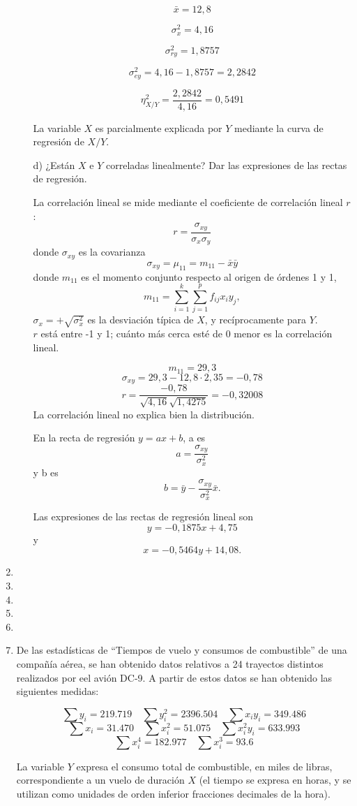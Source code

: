 \documentclass[10pt,a4paper]{article}
\begin{document}
\begin{enumerate}
\begin{itemize}
$$\bar x = 12,8$$

$$\sigma^2_x = 4,16$$

$$\sigma^2_{ry} = 1,8757$$

$$\sigma^2_{ey} = 4,16 - 1,8757 = 2,2842$$

$$\eta^2_{X/Y} = \frac{2,2842}{4,16} = 0,5491$$

La variable $X$ es parcialmente explicada por $Y$ mediante la curva de regresión de $X/Y$.

\item[d)]¿Están $X$ e $Y$ correladas linealmente? Dar las expresiones de las rectas de regresión.

La correlación lineal se mide mediante el coeficiente de correlación lineal $r$:
$$r = \frac{\sigma_{xy}}{\sigma_x \sigma_y}$$
donde $\sigma_{xy}$ es la covarianza
$$\sigma_{xy} = \mu_{11} = m_{11} - \bar x \bar y$$
donde $m_{11}$ es el momento conjunto respecto al origen de órdenes 1 y 1,
$$m_{11} = \sum_{i=1}^k \sum_{j=1}^p f_{ij} x_i y_j,$$
$\sigma_x = +\sqrt{\sigma_x^2}$ es la desviación típica de $X$, y recíprocamente para $Y$.
\\$r$ está entre -1 y 1; cuánto más cerca esté de 0 menor es la correlación lineal.

$$m_{11} = 29,3$$
$$\sigma_{xy} = 29,3 - 12,8\cdot2,35 = -0,78$$
$$r = \frac{-0,78}{\sqrt{4,16}\sqrt{1,4275}} = -0,32008$$
La correlación lineal no explica bien la distribución.

En la recta de regresión $y = ax + b$, a es
$$a = \frac{\sigma_{xy}}{\sigma_x^2}$$
y b es
$$b = \bar y - \frac{\sigma_{xy}}{\sigma_x^2} \bar x.$$

Las expresiones de las rectas de regresión lineal son
$$y = -0,1875x + 4,75$$
y
$$x = -0,5464y + 14,08.$$

\end{itemize}

\newpage
\item
\newpage
\item
\newpage
\item
\newpage
\item
\newpage
\item
\newpage


        \item De las estadísticas de ``Tiempos de vuelo y consumos de combustible'' de una compañía aérea, se han obtenido datos relativos a 24 trayectos distintos realizados por eel avión DC-9. A partir de estos datos se han obtenido las siguientes medidas:
            \begin{center}
                \[
                \sum y_i = 219.719 \quad  \sum y_i^2 = 2396.504 \quad \sum x_i y_i = 349.486
                \]
                \[
                \sum x_i = 31.470 \quad \sum x_i^2 = 51.075 \quad \sum x_i^2 y_i = 633.993
                \]
                \[
                \sum x_i^4 = 182.977 \quad \sum x_i^3 = 93.6
                \]
            \end{center}
            La variable \(Y\) expresa el consumo total de combustible, en miles de libras, correspondiente a un vuelo de duración \(X\) (el tiempo se expresa en horas, y se utilizan como unidades de orden inferior fracciones decimales de la hora).


\end{enumerate}
\end{document}
